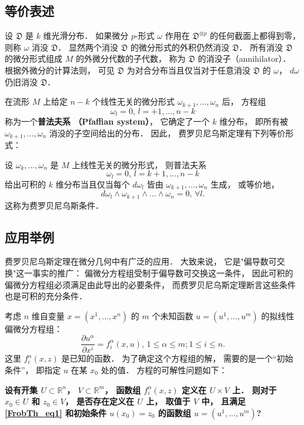 \subsection{等价表述}
设 $\mathfrak{D}$ 是 $k$ 维光滑分布． 如果微分 $p$-形式 $\omega$ 作用在 $\mathfrak{D}^{\otimes p}$ 的任何截面上都得到零， 则称 $\omega$ 消没 $\mathfrak{D}$． 显然两个消没 $\mathfrak{D}$ 的微分形式的外积仍然消没 $\mathfrak{D}$． 所有消没 $\mathfrak{D}$ 的微分形式组成 $M$ 的外微分代数的子代数， 称为 $\mathfrak{D}$ 的消没子（annihilator）． 根据外微分的计算法则， 可见 $\mathfrak{D}$ 为对合分布当且仅当对于任意消没 $\mathfrak{D}$ 的 $\omega$， $d\omega$ 仍旧消没 $\mathfrak{D}$． 

在流形 $M$ 上给定 $n-k$ 个线性无关的微分形式 $\omega_{k+1},...,\omega_{n}$ 后， 方程组
$$
\omega_{l}=0,\,l=+1,...,n-k
$$
称为一个\textbf{普法夫系 （Pfaffian system）}， 它确定了一个 $k$ 维分布， 即所有被 $\omega_{k+1},...,\omega_{n}$ 消没的子空间给出的分布． 因此， 费罗贝尼乌斯定理有下列等价形式：
\begin{theorem}{}
设 $\omega_{k},...,\omega_{n}$ 是 $M$ 上线性无关的微分形式， 则普法夫系
$$
\omega_{l}=0,\,l=k+1,...,n-k
$$
给出可积的 $k$ 维分布当且仅当每个 $d\omega_l$ 皆由 $\omega_{k+1},...,\omega_{n}$ 生成， 或等价地，
$$
d\omega_{l}\wedge\omega_{k+1}\wedge...\wedge\omega_{n}=0,\,\forall l.
$$
这称为费罗贝尼乌斯条件．
\end{theorem}

\subsection{应用举例}
费罗贝尼乌斯定理在微分几何中有广泛的应用． 大致来说， 它是"偏导数可交换"这一事实的推广： 偏微分方程组受制于偏导数可交换这一条件， 因此可积的偏微分方程组必须满足由此导出的必要条件， 而费罗贝尼乌斯定理断言这些条件也是可积的充分条件．

考虑 $n$ 维自变量 $x=(x^1,...,x^n)$ 的 $m$ 个未知函数 $u=(u^1,...,u^m)$ 的拟线性偏微分方程组：
\begin{equation}\label{FrobTh_eq1}
\frac{\partial u^\alpha}{\partial x^i}=f_i^\alpha(x,u),\,1\leq\alpha\leq m;1\leq i\leq n.
\end{equation}
这里 $f_i^\alpha(x,z)$ 是已知的函数． 为了确定这个方程组的解， 需要的是一个“初始条件”， 即指定 $u$ 在某 $x_0$ 处的值． 方程的可解性问题如下：

\textbf{设有开集 $U\subset\mathbb{R}^n$， $V\subset\mathbb{R}^m$， 函数组 $f_i^\alpha(x,z)$ 定义在 $U\times V$ 上． 则对于 $x_0\in U$ 和 $z_0\in V$， 是否存在定义在 $U$ 上， 取值于 $V$ 中， 且满足\autoref{FrobTh_eq1} 和初始条件 $u(x_0)=z_0$ 的函数组 $u=(u^1,...,u^m)$?}

